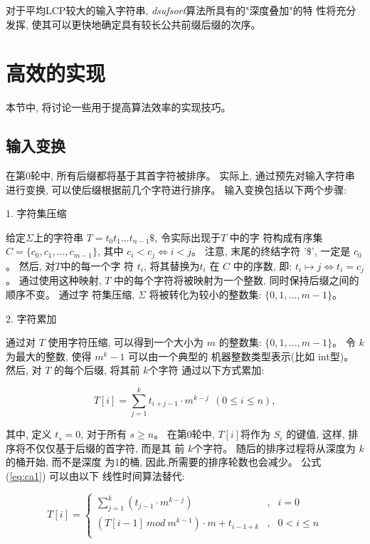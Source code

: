 对于平均LCP较大的输入字符串, \emph{dsufsort}算法所具有的"深度叠加"的特
性将充分发挥, 使其可以更快地确定具有较长公共前缀后缀的次序。


\section{高效的实现}
\label{3_Implementation}

本节中, 将讨论一些用于提高算法效率的实现技巧。

\subsection{输入变换}

在第0轮中, 所有后缀都将基于其首字符被排序。 实际上, 通过预先对输入字符串
进行变换, 可以使后缀根据前几个字符进行排序。 输入变换包括以下两个步骤:

1. 字符集压缩

给定$\Sigma$上的字符串 $T = t_0t_1...t_{n-1}\$$, 令实际出现于$T$ 中的字
符构成有序集 $C = \{c_0, c_1,\dots, c_{m-1}\}$, 其中 $c_i < c_j \iff i
< j$。 注意, 末尾的终结字符 '\$', 一定是 $c_0$。 然后, 对$T$中的每一个字
符 $t_i$, 将其替换为$t_i$ 在 $C$ 中的序数, 即: $t_i \mapsto j \iff t_i
= c_j$。 通过使用这种映射,
$T$ 中的每个字符将被映射为一个整数, 同时保持后缀之间的顺序不变。 通过字
符集压缩, $\Sigma$ 将被转化为较小的整数集: $\{0,1,\dots,m-1\}$。

2. 字符累加

通过对 $T$ 使用字符压缩, 可以得到一个大小为 $m$ 的整数集:
$\{0,1,\dots,m-1\}$。 令 $k$ 为最大的整数, 使得 $m^k-1$ 可以由一个典型的
机器整数类型表示(比如 int型)。 然后, 对 $T$ 的每个后缀, 将其前 $k$个字符
通过以下方式累加:

\begin{equation}\label{eq:ca1}
  T[i] = \sum_{j=1}^k t_{i+j-1} \cdot m^{k-j}  ~~(0 \leq i \leq n),
\end{equation}

\noindent 其中, 定义 $t_s = 0$, 对于所有 $s \geq n$。 在第0轮中,
$T[i]$将作为 $S_i$ 的键值, 这样, 排序将不仅仅基于后缀的首字符, 而是其
前 $k$个字符。 随后的排序过程将从深度为 $k$的桶开始, 而不是深度
为1的桶, 因此,所需要的排序轮数也会减少。 公式 (\ref{eq:ca1}) 可以由以下
线性时间算法替代:

\begin{equation}\label{eq:ca2}
 T[i]  = \left\{
  \begin{array}{lll}
    \sum_{j=1}^{k}(t_{j-1} \cdot m^{k-j})  &,  &  i = 0\\
    (T[i-1]~ mod~m^{k-1}) \cdot m + t_{i-1+k} &,  & 0 < i \leq n \\
    \end{array}\right.
\end{equation}

